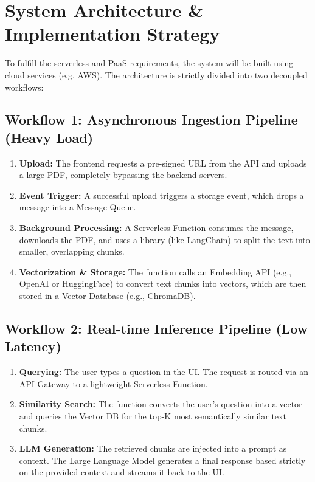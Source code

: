 \documentclass[12pt,a4paper]{article}
\begin{document}
\section{System Architecture \& Implementation Strategy}
To fulfill the serverless and PaaS requirements, the system will be built using cloud services (e.g. AWS). The architecture is strictly divided into two decoupled workflows:

\subsection{Workflow 1: Asynchronous Ingestion Pipeline (Heavy Load)}
\begin{enumerate}
    \item \textbf{Upload:} The frontend requests a pre-signed URL from the API and uploads a large PDF, completely bypassing the backend servers.
    \item \textbf{Event Trigger:} A successful upload triggers a storage event, which drops a message into a Message Queue.
    \item \textbf{Background Processing:} A Serverless Function consumes the message, downloads the PDF, and uses a library (like LangChain) to split the text into smaller, overlapping chunks.
    \item \textbf{Vectorization \& Storage:} The function calls an Embedding API (e.g., OpenAI or HuggingFace) to convert text chunks into vectors, which are then stored in a Vector Database (e.g., ChromaDB).
\end{enumerate}

\subsection{Workflow 2: Real-time Inference Pipeline (Low Latency)}
\begin{enumerate}
    \item \textbf{Querying:} The user types a question in the UI. The request is routed via an API Gateway to a lightweight Serverless Function.
    \item \textbf{Similarity Search:} The function converts the user's question into a vector and queries the Vector DB for the top-K most semantically similar text chunks.
    \item \textbf{LLM Generation:} The retrieved chunks are injected into a prompt as context. The Large Language Model generates a final response based strictly on the provided context and streams it back to the UI.
\end{enumerate}
\end{document}
